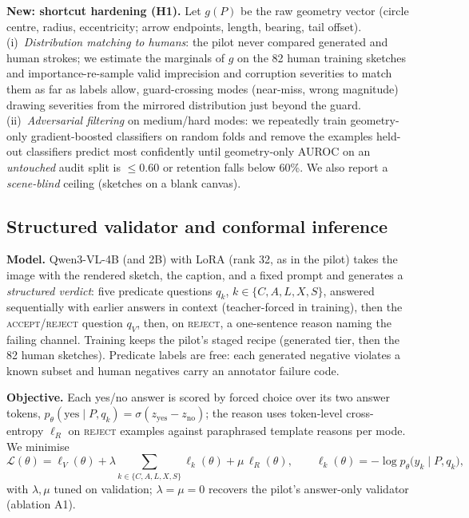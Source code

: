 \documentclass{article} %
\newcommand{\accept}{\textsc{accept}}
\newcommand{\reject}{\textsc{reject}}
\begin{document}
\textbf{New: shortcut hardening (H1).} Let $g(P)$ be the raw geometry vector (circle centre, radius, eccentricity; arrow endpoints, length, bearing, tail offset). (i)~\emph{Distribution matching to humans}: the pilot never compared generated and human strokes; we estimate the marginals of $g$ on the 82 human training sketches and importance-re-sample valid imprecision and corruption severities to match them as far as labels allow, guard-crossing modes (near-miss, wrong magnitude) drawing severities from the mirrored distribution just beyond the guard. (ii)~\emph{Adversarial filtering} \citep{lebras2020aflite} on medium/hard modes: we repeatedly train geometry-only gradient-boosted classifiers \citep{ke2017lightgbm} on random folds and remove the examples held-out classifiers predict most confidently until geometry-only AUROC on an \emph{untouched} audit split is $\le0.60$ or retention falls below 60\%. We also report a \emph{scene-blind} ceiling (sketches on a blank canvas).

\subsection{Structured validator and conformal inference}
\label{sec:validator}
\textbf{Model.} Qwen3-VL-4B (and 2B) with LoRA (rank 32, as in the pilot) takes the image with the rendered sketch, the caption, and a fixed prompt and generates a \emph{structured verdict}: five predicate questions $q_k$, $k\in\{C,A,L,X,S\}$, answered sequentially with earlier answers in context (teacher-forced in training), then the \accept/\reject{} question $q_V$, then, on \reject, a one-sentence reason naming the failing channel. Training keeps the pilot's staged recipe (generated tier, then the 82 human sketches). Predicate labels are free: each generated negative violates a known subset and human negatives carry an annotator failure code.

\textbf{Objective.} Each yes/no answer is scored by forced choice over its two answer tokens, $p_\theta(\text{yes}\mid P,q_k)=\sigma(z_{\text{yes}}-z_{\text{no}})$; the reason uses token-level cross-entropy $\ell_R$ on \reject{} examples against paraphrased template reasons per mode. We minimise
\begin{equation}
\mathcal{L}(\theta)=\ell_V(\theta)+\lambda\!\!\sum_{k\in\{C,A,L,X,S\}}\!\!\ell_k(\theta)+\mu\,\ell_R(\theta),\qquad
\ell_k(\theta)=-\log p_\theta\big(y_k \mid P, q_k\big),
\label{eq:loss}
\end{equation}
with $\lambda,\mu$ tuned on validation; $\lambda=\mu=0$ recovers the pilot's answer-only validator (ablation A1).
\end{document}
